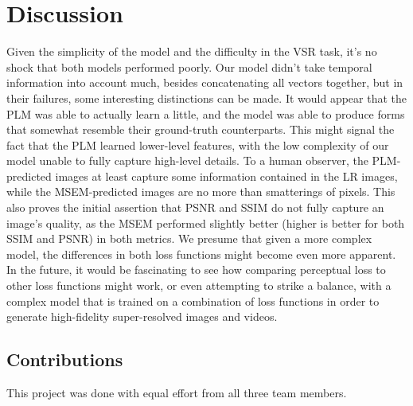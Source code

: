 \documentclass{article}
\begin{document}
\section{Discussion}

Given the simplicity of the model and the difficulty in the VSR task, it's no shock that both models performed poorly. Our model didn't take temporal information into account much, besides concatenating all vectors together, but in their failures, some interesting distinctions can be made. It would appear that the PLM was able to actually learn a little, and the model was able to produce forms that somewhat resemble their ground-truth counterparts. This might signal the fact that the PLM learned lower-level features, with the low complexity of our model unable to fully capture high-level details. To a human observer, the PLM-predicted images at least capture some information contained in the LR images, while the MSEM-predicted images are no more than smatterings of pixels. This also proves the initial assertion that PSNR and SSIM do not fully capture an image's quality, as the MSEM performed slightly better (higher is better for both SSIM and PSNR) in both metrics. We presume that given a more complex model, the differences in both loss functions might become even more apparent. In the future, it would be fascinating to see how comparing perceptual loss to other loss functions might work, or even attempting to strike a balance, with a complex model that is trained on a combination of loss functions in order to generate high-fidelity super-resolved images and videos. 

\subsection{Contributions}

This project was done with equal effort from all three team members.

\printbibliography %
\end{document}
